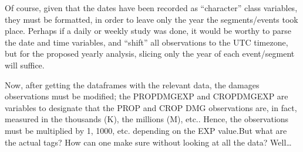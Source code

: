 \documentclass[
]{article}
\newenvironment{Shaded}{\begin{snugshade}}{\end{snugshade}}
\newcommand{\AttributeTok}[1]{\textcolor[rgb]{0.77,0.63,0.00}{#1}}
\newcommand{\CommentTok}[1]{\textcolor[rgb]{0.56,0.35,0.01}{\textit{#1}}}
\newcommand{\FunctionTok}[1]{\textcolor[rgb]{0.00,0.00,0.00}{#1}}
\newcommand{\NormalTok}[1]{#1}
\newcommand{\OtherTok}[1]{\textcolor[rgb]{0.56,0.35,0.01}{#1}}
\newcommand{\SpecialCharTok}[1]{\textcolor[rgb]{0.00,0.00,0.00}{#1}}
\newcommand{\StringTok}[1]{\textcolor[rgb]{0.31,0.60,0.02}{#1}}
\begin{document}
Of course, given that the dates have been recorded as ``character''
class variables, they must be formatted, in order to leave only the year
the segments/events took place. Perhaps if a daily or weekly study was
done, it would be worthy to parse the date and time variables, and
``shift'' all observations to the UTC timezone, but for the proposed
yearly analysis, slicing only the year of each event/segment will
suffice.

\begin{Shaded}
\end{Shaded}

Now, after getting the dataframes with the relevant data, the damages
observations must be modified; the PROPDMGEXP and CROPDMGEXP are
variables to designate that the PROP and CROP DMG observations are, in
fact, measured in the thousands (K), the millions (M), etc.. Hence, the
observations must be multiplied by 1, 1000, etc. depending on the EXP
value.But what are the actual tags? How can one make sure without
looking at all the data? Well\ldots{}
\end{document}
